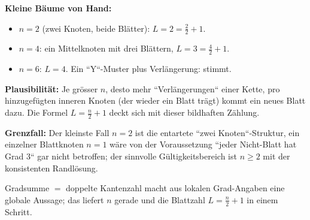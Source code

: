 \begin{kontrolle}
\textbf{Kleine Bäume von Hand:}
\begin{itemize}
  \item $n=2$ (zwei Knoten, beide Blätter): $L=2=\frac22+1$. \checkmark
  \item $n=4$: ein Mittelknoten mit drei Blättern, $L=3=\frac42+1$.
        \checkmark
  \item $n=6$: $L=4$. Ein ``Y``-Muster plus Verlängerung: stimmt.
\end{itemize}

\textbf{Plausibilität:} Je grösser $n$, desto mehr ``Verlängerungen`` einer
Kette, pro hinzugefügten inneren Knoten (der wieder ein Blatt trägt)
kommt ein neues Blatt dazu. Die Formel $L=\frac n2+1$ deckt sich mit
dieser bildhaften Zählung.

\textbf{Grenzfall:} Der kleinste Fall $n=2$ ist die entartete ``zwei
Knoten``-Struktur, ein einzelner Blattknoten $n=1$ wäre von der
Voraussetzung ``jeder Nicht-Blatt hat Grad 3`` gar nicht betroffen;
der sinnvolle Gültigkeitsbereich ist $n\ge2$ mit der konsistenten
Randlösung.
\end{kontrolle}

\begin{merksatz}
Gradsumme $=$ doppelte Kantenzahl macht aus lokalen Grad-Angaben eine
globale Aussage; das liefert $n$ gerade und die Blattzahl
$L=\frac n2+1$ in einem Schritt.
\end{merksatz}
